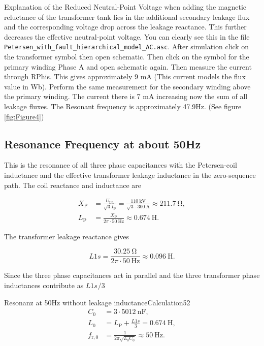 Explanation of the Reduced Neutral-Point Voltage when adding the magnetic reluctance of the transformer tank lies in the additional secondary leakage flux and the corresponding voltage drop across the leakage reactance. This further decreases the effective neutral‑point voltage.
You can clearly see this in the file \texttt{Petersen\_with\_fault\_hierarchical\_model\_AC.asc}. After simulation click on the transformer symbol then open schematic. Then click on the symbol for the primary winding Phase A and open schematic again. Then measure the current through RPhis. This gives approximately 9 mA (This current models the flux value in Wb). Perform the same measurement for the secondary winding above the primary winding. The current there is 7 mA increasing now the sum of all leakage fluxes. The Resonant frequency is approximately 47.9Hz. (See figure \ref{fig:Figure4})


\subsection{Resonance Frequency at about 50Hz}
\label{sec:Resonant Frequency at about 50Hz}
This is the resonance of all three phase capacitances with the Petersen-coil
inductance and the effective transformer leakage inductance in the
zero-sequence path. The coil reactance and inductance are

\begin{align}
	X_{\mathrm P}&=\frac{U_{\mathrm{LL}}}{\sqrt{3}I_{\mathrm P}}
	=\frac{\SI{110}{\kilo\volt}}{\sqrt{3}\cdot\SI{300}{\ampere}}
	\approx\SI{211.7}{\ohm},\\
	L_{\mathrm P}&=\frac{X_{\mathrm P}}{2\pi\cdot\SI{50}{\hertz}}
	\approx\SI{0.674}{\henry}.
\end{align}

The transformer leakage reactance gives

\begin{equation}
	L1s=\frac{\SI{30.25}{\ohm}}
	{2\pi\cdot\SI{50}{\hertz}}\approx\SI{0.096}{\henry}.
\end{equation}

Since the three phase capacitances act in parallel and the three transformer
phase inductances contribute as $L1s_{}/3$ 


\begin{calculation}{Resonanz at 50Hz without leakage inductance}{Calculation52}
	\begin{align}
		C_0&=3\cdot\SI{5012}{\nano\farad},\\
		L_0&=L_{\mathrm P}+\frac{L1s}{3}
		=\SI{0.674}{\henry},\\
		f_{\mathrm r,0}&=\frac{1}{2\pi\sqrt{L_0C_0}}
		\approx\boxed{\SI{50}{\hertz}}.
	\end{align}
\end{calculation}


